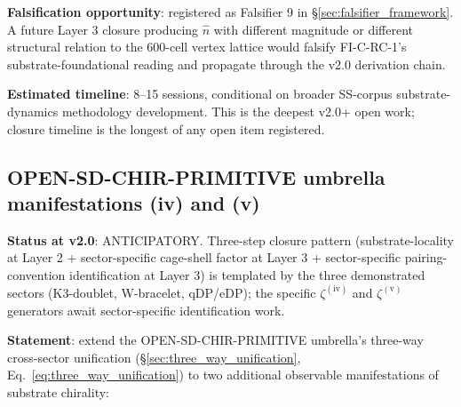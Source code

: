 \documentclass[11pt,letterpaper]{article}
\begin{document}
\textbf{Falsification opportunity}: registered as Falsifier 9 in \S\ref{sec:falsifier_framework}. A future Layer 3 closure producing $\hat{n}$ with different magnitude or different structural relation to the 600-cell vertex lattice would falsify FI-C-RC-1's substrate-foundational reading and propagate through the v2.0 derivation chain.

\textbf{Estimated timeline}: 8--15 sessions, conditional on broader SS-corpus substrate-dynamics methodology development. This is the deepest v2.0+ open work; closure timeline is the longest of any open item registered.

\subsection{OPEN-SD-CHIR-PRIMITIVE umbrella manifestations (iv) and (v)}\label{sec:open_umbrella_manifestations_iv_v}

\textbf{Status at v2.0}: ANTICIPATORY. Three-step closure pattern (substrate-locality at Layer 2 + sector-specific cage-shell factor at Layer 3 + sector-specific pairing-convention identification at Layer 3) is templated by the three demonstrated sectors (K3-doublet, W-bracelet, qDP/eDP); the specific $\zeta^{(\text{iv})}$ and $\zeta^{(\text{v})}$ generators await sector-specific identification work.

\textbf{Statement}: extend the OPEN-SD-CHIR-PRIMITIVE umbrella's three-way cross-sector unification (\S\ref{sec:three_way_unification}, Eq.~\eqref{eq:three_way_unification}) to two additional observable manifestations of substrate chirality:
\end{document}
